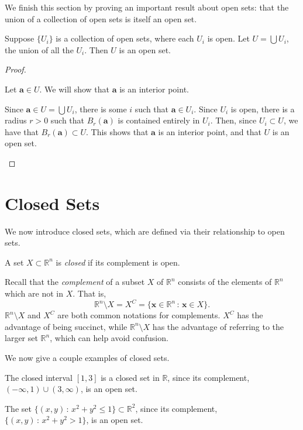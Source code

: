 \documentclass{ximera}
\begin{document}
We finish this section by proving an important result about open sets: that the union of a collection of open sets is itself an open set.

\begin{theorem}
Suppose $\{U_i\}$ is a collection of open sets, where each $U_i$ is open. Let $U=\bigcup U_i$, the union of all the $U_i$. Then $U$ is an open set.
\end{theorem}

\begin{proof}
\begin{unfoldable}
Let $\mathbf{a}\in U$. We will show that $\mathbf{a}$ is an interior point.

Since $\mathbf{a}\in U=\bigcup U_i$, there is some $i$ such that $\mathbf{a}\in U_i$. Since $U_i$ is open, there is a radius $r>0$ such that $B_r(\mathbf{a})$ is contained entirely in $U_i$. Then, since $U_i \subset U$, we have that $B_r(\mathbf{a})\subset U$. This shows that $\mathbf{a}$ is an interior point, and that $U$ is an open set.

\end{unfoldable}
\end{proof}

\section{Closed Sets}

We now introduce closed sets, which are defined via their relationship to open sets.

\begin{definition}
A set $X\subset \mathbb{R}^n$ is \emph{closed} if its complement is open.
\end{definition}

Recall that the \emph{complement} of a subset $X$ of $\mathbb{R}^n$ consists of the elements of $\mathbb{R}^n$ which are not in $X$. That is,
\[
\mathbb{R}^n\setminus X = X^C = \{\mathbf{x}\in\mathbb{R}^n\,:\,\mathbf{x}\in X\}.
\]
$\mathbb{R}^n\setminus X$ and $X^C$ are both common notations for complements. $X^C$ has the advantage of being succinct, while $\mathbb{R}^n\setminus X$ has the advantage of referring to the larger set $\mathbb{R}^n$, which can help avoid confusion.

We now give a couple examples of closed sets.

\begin{example}
\begin{foldable}
The closed interval $[1,3]$ is a closed set in $\mathbb{R}$, since its complement, $(-\infty, 1)\cup (3,\infty)$, is an open set.

The set $\{(x,y)\,:\,x^2+y^2\leq 1\}\subset \mathbb{R}^2$, since its complement, $\{(x,y)\,:\,x^2+y^2> 1\}$, is an open set.
\end{foldable}
\end{example}
\end{document}

